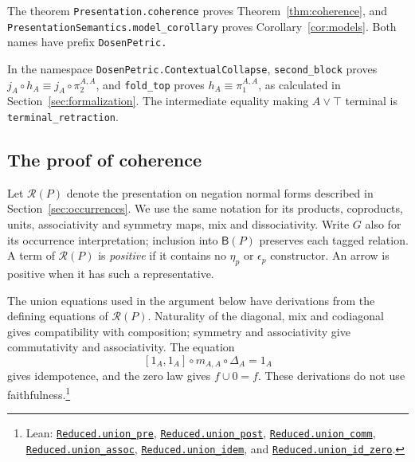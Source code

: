 \documentclass[11pt]{article}
\newcommand{\B}{\mathsf B}
\begin{document}
The theorem \texttt{Presentation.\allowbreak{}coherence} proves
Theorem~\ref{thm:coherence}, and
\texttt{PresentationSemantics.\allowbreak{}model\_corollary} proves
Corollary~\ref{cor:models}.
Both names have prefix \texttt{DosenPetric.}

In the namespace \texttt{DosenPetric.\allowbreak{}ContextualCollapse},
\texttt{second\_block} proves
$j_A\circ h_A\equiv j_A\circ\pi_2^{A,A}$, and
\texttt{fold\_top} proves
$h_A\equiv\pi_1^{A,A}$, as calculated in
Section~\ref{sec:formalization}.
The intermediate equality making $A\vee\top$ terminal is
\texttt{terminal\_retraction}.

\subsection{The proof of coherence}\label{app:coherence-proof}

Let $\mathcal R(P)$ denote the presentation on negation normal
forms described in Section~\ref{sec:occurrences}. We use the same
notation for its products, coproducts, units, associativity and
symmetry maps, mix and dissociativity. Write $G$ also for its occurrence
interpretation; inclusion into $\B(P)$ preserves each tagged
relation. A term of $\mathcal R(P)$
is \emph{positive} if it contains no $\eta_p$ or $\epsilon_p$
constructor. An arrow is positive when it has such a representative.

The union equations used in the argument below have derivations
from the defining equations of $\mathcal R(P)$.
Naturality of the diagonal, mix and codiagonal gives compatibility
with composition; symmetry and associativity give commutativity
and associativity. The equation
\[
 [1_A,1_A]\circ m_{A,A}\circ\Delta_A=1_A
\]
gives idempotence, and the zero law gives $f\cup0=f$.
These derivations do not use faithfulness.\footnote{\raggedright Lean:
\href{https://github.com/flengyel/Dosen-Petric-Maximality/blob/5dbee39bea09539bd130f729e82636419f71f920/DosenPetric/ReducedUnion.lean\#L80}{\texttt{Reduced.\allowbreak{}union\_pre}},
\href{https://github.com/flengyel/Dosen-Petric-Maximality/blob/5dbee39bea09539bd130f729e82636419f71f920/DosenPetric/ReducedUnion.lean\#L85}{\texttt{Reduced.\allowbreak{}union\_post}},
\href{https://github.com/flengyel/Dosen-Petric-Maximality/blob/5dbee39bea09539bd130f729e82636419f71f920/DosenPetric/ReducedUnion.lean\#L90}{\texttt{Reduced.\allowbreak{}union\_comm}},
\href{https://github.com/flengyel/Dosen-Petric-Maximality/blob/5dbee39bea09539bd130f729e82636419f71f920/DosenPetric/ReducedUnion.lean\#L131}{\texttt{Reduced.\allowbreak{}union\_assoc}},
\href{https://github.com/flengyel/Dosen-Petric-Maximality/blob/5dbee39bea09539bd130f729e82636419f71f920/DosenPetric/ReducedUnion.lean\#L97}{\texttt{Reduced.\allowbreak{}union\_idem}}, and
\href{https://github.com/flengyel/Dosen-Petric-Maximality/blob/5dbee39bea09539bd130f729e82636419f71f920/DosenPetric/ReducedUnion.lean\#L145}{\texttt{Reduced.\allowbreak{}union\_id\_zero}}.}
\end{document}
